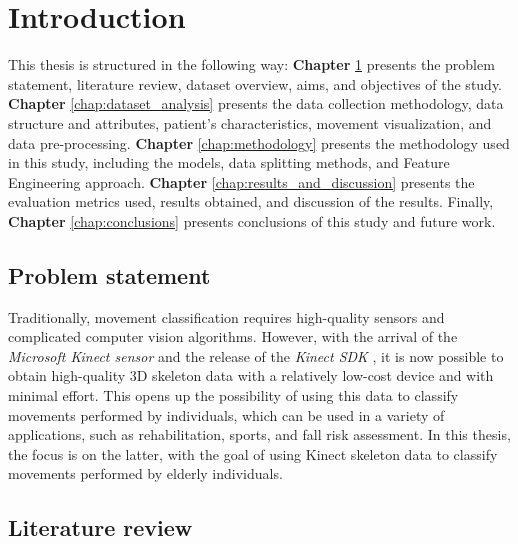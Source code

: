 \hypersetup{colorlinks=true, linkcolor=blue, citecolor=red}

\chapter{Introduction} \label{chap:introduction}

   This thesis is structured in the following way: \textbf{Chapter} \ref{chap:introduction} presents the problem statement, literature review, dataset overview, aims, and objectives of the study. \textbf{Chapter} \ref{chap:dataset_analysis} presents the data collection methodology, data structure and attributes, patient's characteristics, movement visualization, and data pre-processing. \textbf{Chapter} \ref{chap:methodology} presents the methodology used in this study, including the models, data splitting methods, and Feature Engineering approach. \textbf{Chapter} \ref{chap:results_and_discussion} presents the evaluation metrics used, results obtained, and discussion of the results. Finally, \textbf{Chapter} \ref{chap:conclusions} presents conclusions of this study and future work.

   \section{Problem statement}

      Traditionally, movement classification requires high-quality sensors and complicated computer vision algorithms. However, with the arrival of the \textit{Microsoft Kinect sensor} and the release of the \textit{Kinect SDK} \cite{jana_kinect_2012}, it is now possible to obtain high-quality 3D skeleton data with a relatively low-cost device and with minimal effort. This opens up the possibility of using this data to classify movements performed by individuals, which can be used in a variety of applications, such as rehabilitation, sports, and fall risk assessment. In this thesis, the focus is on the latter, with the goal of using Kinect skeleton data to classify movements performed by elderly individuals.
  
   \section{Literature review}

